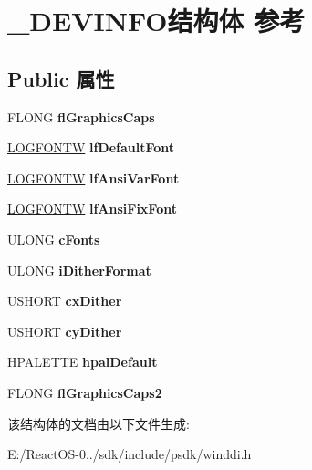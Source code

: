 \hypertarget{struct___d_e_v_i_n_f_o}{}\section{\+\_\+\+D\+E\+V\+I\+N\+F\+O结构体 参考}
\label{struct___d_e_v_i_n_f_o}
\subsection*{Public 属性}
\begin{DoxyCompactItemize}
\item 
\mbox{\label{struct___d_e_v_i_n_f_o_a687cdb4fb24705b112fe0eabd907df61}} 
F\+L\+O\+NG {\bfseries fl\+Graphics\+Caps}
\item 
\mbox{\label{struct___d_e_v_i_n_f_o_af87fd059729615d281bd29a31222bd89}} 
\hyperlink{struct_l_o_g_f_o_n_t_w}{L\+O\+G\+F\+O\+N\+TW} {\bfseries lf\+Default\+Font}
\item 
\mbox{\label{struct___d_e_v_i_n_f_o_a2848c89b6df7cb12bc2cbb8e43a70c75}} 
\hyperlink{struct_l_o_g_f_o_n_t_w}{L\+O\+G\+F\+O\+N\+TW} {\bfseries lf\+Ansi\+Var\+Font}
\item 
\mbox{\label{struct___d_e_v_i_n_f_o_ab4fac64129027d19e0d5d57fbfa82caf}} 
\hyperlink{struct_l_o_g_f_o_n_t_w}{L\+O\+G\+F\+O\+N\+TW} {\bfseries lf\+Ansi\+Fix\+Font}
\item 
\mbox{\label{struct___d_e_v_i_n_f_o_a9ac945b71f7d153315a39aee64c6a125}} 
U\+L\+O\+NG {\bfseries c\+Fonts}
\item 
\mbox{\label{struct___d_e_v_i_n_f_o_a9be40c9d23a7e31d772b140aab77d267}} 
U\+L\+O\+NG {\bfseries i\+Dither\+Format}
\item 
\mbox{\label{struct___d_e_v_i_n_f_o_ae13366469e21c6239fe4d99a686ca0a6}} 
U\+S\+H\+O\+RT {\bfseries cx\+Dither}
\item 
\mbox{\label{struct___d_e_v_i_n_f_o_a16a53650840261e8b26fda64bf4c4a90}} 
U\+S\+H\+O\+RT {\bfseries cy\+Dither}
\item 
\mbox{\label{struct___d_e_v_i_n_f_o_af75cedc41504aeb813f2487ab369de82}} 
H\+P\+A\+L\+E\+T\+TE {\bfseries hpal\+Default}
\item 
\mbox{\label{struct___d_e_v_i_n_f_o_afc958b47231b54768ba3d65da7e81066}} 
F\+L\+O\+NG {\bfseries fl\+Graphics\+Caps2}
\end{DoxyCompactItemize}


该结构体的文档由以下文件生成\+:\begin{DoxyCompactItemize}
\item 
E\+:/\+React\+O\+S-\/0../sdk/include/psdk/winddi.\+h\end{DoxyCompactItemize}
